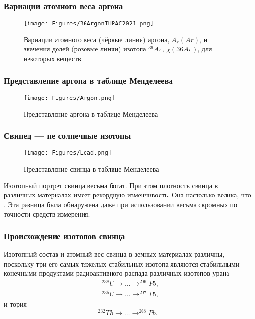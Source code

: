 \begin{frame}
	\frametitle{Вариации атомного веса  аргона}
	
\begin{figure}[ht] 
	\centering\small
	\texttt{[image: Figures/36ArgonIUPAC2021.png]}
	\caption{Вариации атомного веса (чёрные линии) аргона, $A_r(Ar)$, и значения долей	(розовые линии) изотопа $^{36}Ar$, $\chi(36Ar)$, для некоторых веществ}
	\label{f:ArgonVar}
\end{figure}
	
\end{frame}


\begin{frame}
	\frametitle{Представление аргона в таблице Менделеева}
	
\begin{figure}[ht] 
	\centering\small
	\texttt{[image: Figures/Argon.png]}
	\caption{Представление аргона в таблице Менделеева} 
	\label{f:Argon}
\end{figure}
\end{frame}




\begin{frame}
	\frametitle{Свинец --- не солнечные изотопы}
	
	\begin{figure}[ht] 
		\centering\small
		\texttt{[image: Figures/Lead.png]}
		\caption{Представление свинца в таблице Менделеева} 
		\label{f:Lead}
	\end{figure}
	
{\small
	Изотопный портрет свинца весьма богат. При этом плотность свинца в различных материалах имеет рекордную изменчивость. Она настолько велика, что . Эта разница была обнаружена даже при использовании весьма скромных по точности средств измерения. }
	
	
\end{frame}

\begin{frame}
	\frametitle{Происхождение изотопов свинца}
	
Изотопный состав и атомный вес свинца в земных материалах различны, поскольку три его самых тяжелых стабильных изотопа являются стабильными конечными продуктами радиоактивного распада различных изотопов урана 
\begin{align*}
	& ^{238}U \longrightarrow \ldots \longrightarrow  ^{206}Pb,  \\ 
	& ^{235}U \longrightarrow \ldots \longrightarrow  ^{207}Pb, 
\end{align*}
и тория 
\begin{equation*} 
	^{232}Th \longrightarrow \ldots \longrightarrow ^{208}Pb.
\end{equation*}
\end{frame}

